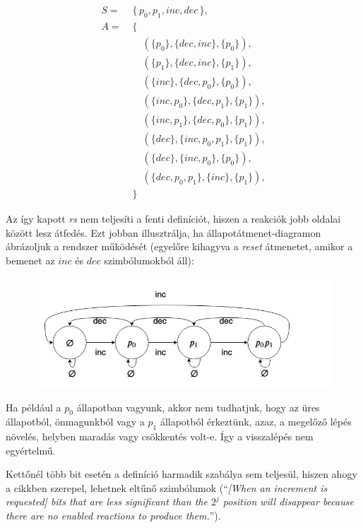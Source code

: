 \documentclass[12pt]{article}
\theoremstyle{definition}
\newcommand{\inc}{\textit{inc}}
\newcommand{\dec}{\textit{dec}}
\begin{document}
    \begin{align*}
        S = \; & \{ \, p_{0}, p_{1},  \inc, \dec \, \}, \\
        A = \; & \{ \\
            & \quad (\{ p_{0} \}, \{ \dec, \inc \}, \{ p_{0} \}), \\
            & \quad (\{ p_{1} \}, \{ \dec, \inc \}, \{ p_{1} \}), \\
            & \quad (\{ \inc \}, \{ \dec, p_{0} \}, \{ p_{0} \}), \\
            & \quad (\{ \inc, p_{0} \}, \{ \dec, p_{1} \}, \{ p_{1} \}), \\
            & \quad (\{ \inc, p_{1} \}, \{ \dec, p_{0} \}, \{ p_{1} \}), \\
            & \quad (\{ \dec \}, \{ \inc, p_{0}, p_{1} \}, \{ p_{1} \}), \\
            & \quad (\{ \dec \}, \{ \inc, p_{0} \}, \{ p_{0} \}), \\
            & \quad (\{ \dec, p_{0}, p_{1} \}, \{ \inc \}, \{ p_{1} \}), \\
        \; &\}
    \end{align*}

    Az így kapott \textit{rs} nem teljesíti a fenti definíciót, hiszen a reakciók jobb oldalai között lesz átfedés. Ezt jobban illusztrálja, ha állapotátmenet-diagramon ábrázoljuk a rendszer működését (egyelőre kihagyva a \textit{reset} átmenetet, amikor a bemenet az $\inc$ és $\dec$ szimbólumokból áll):

    \begin{figure}[h]
        \centering
        \includegraphics[width=5in]{two-bit-counter-states.jpg}
    \end{figure}

    Ha például a $p_{0}$ állapotban vagyunk, akkor nem tudhatjuk, hogy az üres állapotból, önmagunkból vagy a $p_{1}$ állapotból érkeztünk, azaz, a megelőző lépés növelés, helyben maradás vagy csökkentés volt-e. Így a visszalépés nem egyértelmű.

    Kettőnél több bit esetén a definíció harmadik szabálya sem teljesül, hiszen ahogy a cikkben szerepel, lehetnek eltűnő szimbólumok (\enquote{\textit{[When an increment is requested] bits that are less significant than the $2^{j}$ position will disappear because there are no enabled reactions to produce them.}}).
\end{document}
